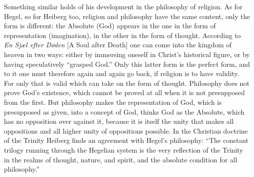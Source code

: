 \documentclass[12pt,a4paper]{book}
\begin{document}
Something similar holds of his development in the philosophy of religion. As for Hegel, so for
Heiberg too, religion and philosophy have the same content, only the form is different: the
Absolute (God) appears in the one in the form of representation (imagination), in the other in
the form of thought. According to \emph{En Sjæl efter Døden} [A Soul after Death] one can come
into the kingdom of heaven in two ways: either by immersing oneself in Christ's historical
figure, or by having speculatively ``grasped God.'' Only this latter form is the perfect form,
and to it one must therefore again and again go back, if religion is to have validity. For only
that is valid which can take on the form of thought. Philosophy does not prove God's existence,
which cannot be proved at all when it is not presupposed from the first. But philosophy makes
the representation of God, which is presupposed as given, into a concept of God, thinks God as
the Absolute, which has no opposition over against it, because it is itself the unity that makes
all oppositions and all higher unity of oppositions possible. In the Christian doctrine of the
Trinity Heiberg finds an agreement with Hegel's philosophy: ``The constant trilogy running
through the Hegelian system is the very reflection of the Trinity in the realms of thought,
nature, and spirit, and the absolute condition for all philosophy.''
\end{document}
